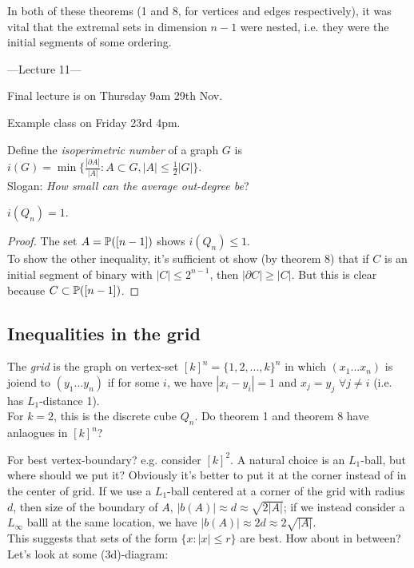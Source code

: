 \documentclass[a4paper]{article}
\begin{document}
\begin{rem}
    In both of these theorems (1 and 8, for vertices and edges respectively), it was vital that the extremal sets in dimension $n-1$ were nested, i.e. they were the initial segments of some ordering.
\end{rem}

---Lecture 11---

Final lecture is on Thursday 9am 29th Nov.

Example class on Friday 23rd 4pm.

Define the \emph{isoperimetric number} of a graph $G$ is $i(G) = \min\{\frac{|\partial A|}{|A|}: A \subset G, |A| \leq \frac{1}{2}|G|\}$.\\
Slogan: \emph{How small can the average out-degree be}?

\begin{coro}
    $i(Q_n) = 1$.
    \begin{proof}
        The set $A = \P([n-1])$ shows $i(Q_n) \leq 1$.\\
        To show the other inequality, it's sufficient ot show (by theorem 8) that if $C$ is an initial segment of binary with $|C| \leq 2^{n-1}$, then $|\partial C| \geq |C|$.
            But this is clear because $C \subset \P([n-1])$.
    \end{proof}
\end{coro}

\subsection{Inequalities in the grid}

The \emph{grid} is the graph on vertex-set $[k]^n = \{1,2,...,k\}^n$ in which $(x_1...x_n)$ is joiend to $(y_1...y_n)$ if for some $i$, we have $|x_i - y_i| = 1$ and $x_j = y_j$ $\forall j \neq i$ (i.e. has $L_1$-distance 1).\\
For $k=2$, this is the discrete cube $Q_n$. Do theorem 1 and theorem 8 have anlaogues in $[k]^n$?

For best vertex-boundary? e.g. consider $[k]^2$. A natural choice is an $L_1$-ball, but where should we put it? Obviously it's better to put it at the corner instead of in the center of grid. If we use a $L_1$-ball centered at a corner of the grid with radius $d$, then size of the boundary of $A$, $|b(A)| \approx d \approx \sqrt{2|A|}$; if we instead consider a $L_\infty$ balll at the same location, we have $|b(A)| \approx 2d \approx 2\sqrt{|A|}$.\\
This suggests that sets of the form $\{x: |x| \leq r\}$ are best. How about in between? Let's look at some (3d)-diagram:
\end{document}
